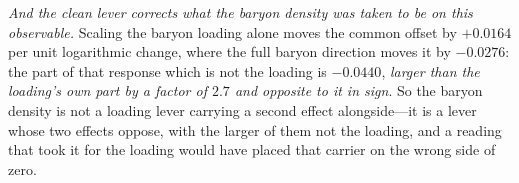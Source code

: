 \documentclass[11pt,a4paper]{article}
\theoremstyle{plain}
\theoremstyle{definition}
\theoremstyle{remark}
\begin{document}
\emph{And the clean lever corrects what the baryon density was taken to be on this observable.}
Scaling the baryon loading alone moves the common offset by $+0.0164$ per unit logarithmic change,
where the full baryon direction moves it by $-0.0276$: the part of that response which is not the
loading is $-0.0440$, \emph{larger than the loading's own part by a factor of $2.7$ and opposite to
it in sign}. So the baryon density is not a loading lever carrying a second effect alongside---it is
a lever whose two effects oppose, with the larger of them not the loading, and a reading that took
it for the loading would have placed that carrier on the wrong side of
zero.
\end{document}
